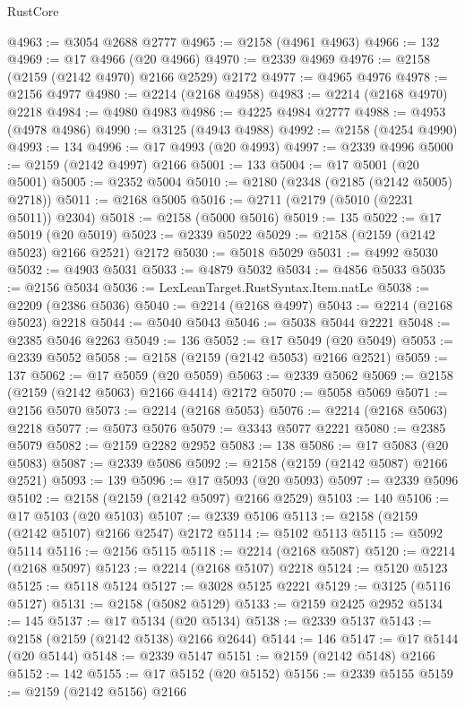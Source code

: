 \begin{lexlean}{RustCore}
\begin{coremodule}
@4963 := @3054 @2688 @2777
@4965 := @2158 (@4961 @4963)
@4966 := 132
@4969 := @17 @4966 (@20 @4966)
@4970 := @2339 @4969
@4976 := @2158 (@2159 (@2142 @4970) @2166 @2529) @2172
@4977 := @4965 @4976
@4978 := @2156 @4977
@4980 := @2214 (@2168 @4958)
@4983 := @2214 (@2168 @4970) @2218
@4984 := @4980 @4983
@4986 := @4225 @4984 @2777
@4988 := @4953 (@4978 @4986)
@4990 := @3125 (@4943 @4988)
@4992 := @2158 (@4254 @4990)
@4993 := 134
@4996 := @17 @4993 (@20 @4993)
@4997 := @2339 @4996
@5000 := @2159 (@2142 @4997) @2166
@5001 := 133
@5004 := @17 @5001 (@20 @5001)
@5005 := @2352 @5004
@5010 := @2180 (@2348 (@2185 (@2142 @5005) @2718))
@5011 := @2168 @5005
@5016 := @2711 (@2179 (@5010 (@2231 @5011)) @2304)
@5018 := @2158 (@5000 @5016)
@5019 := 135
@5022 := @17 @5019 (@20 @5019)
@5023 := @2339 @5022
@5029 := @2158 (@2159 (@2142 @5023) @2166 @2521) @2172
@5030 := @5018 @5029
@5031 := @4992 @5030
@5032 := @4903 @5031
@5033 := @4879 @5032
@5034 := @4856 @5033
@5035 := @2156 @5034
@5036 := LexLeanTarget.RustSyntax.Item.natLe
@5038 := @2209 (@2386 @5036)
@5040 := @2214 (@2168 @4997)
@5043 := @2214 (@2168 @5023) @2218
@5044 := @5040 @5043
@5046 := @5038 @5044 @2221
@5048 := @2385 @5046 @2263
@5049 := 136
@5052 := @17 @5049 (@20 @5049)
@5053 := @2339 @5052
@5058 := @2158 (@2159 (@2142 @5053) @2166 @2521)
@5059 := 137
@5062 := @17 @5059 (@20 @5059)
@5063 := @2339 @5062
@5069 := @2158 (@2159 (@2142 @5063) @2166 @4414) @2172
@5070 := @5058 @5069
@5071 := @2156 @5070
@5073 := @2214 (@2168 @5053)
@5076 := @2214 (@2168 @5063) @2218
@5077 := @5073 @5076
@5079 := @3343 @5077 @2221
@5080 := @2385 @5079
@5082 := @2159 @2282 @2952
@5083 := 138
@5086 := @17 @5083 (@20 @5083)
@5087 := @2339 @5086
@5092 := @2158 (@2159 (@2142 @5087) @2166 @2521)
@5093 := 139
@5096 := @17 @5093 (@20 @5093)
@5097 := @2339 @5096
@5102 := @2158 (@2159 (@2142 @5097) @2166 @2529)
@5103 := 140
@5106 := @17 @5103 (@20 @5103)
@5107 := @2339 @5106
@5113 := @2158 (@2159 (@2142 @5107) @2166 @2547) @2172
@5114 := @5102 @5113
@5115 := @5092 @5114
@5116 := @2156 @5115
@5118 := @2214 (@2168 @5087)
@5120 := @2214 (@2168 @5097)
@5123 := @2214 (@2168 @5107) @2218
@5124 := @5120 @5123
@5125 := @5118 @5124
@5127 := @3028 @5125 @2221
@5129 := @3125 (@5116 @5127)
@5131 := @2158 (@5082 @5129)
@5133 := @2159 @2425 @2952
@5134 := 145
@5137 := @17 @5134 (@20 @5134)
@5138 := @2339 @5137
@5143 := @2158 (@2159 (@2142 @5138) @2166 @2644)
@5144 := 146
@5147 := @17 @5144 (@20 @5144)
@5148 := @2339 @5147
@5151 := @2159 (@2142 @5148) @2166
@5152 := 142
@5155 := @17 @5152 (@20 @5152)
@5156 := @2339 @5155
@5159 := @2159 (@2142 @5156) @2166

\end{coremodule}
\end{lexlean}
